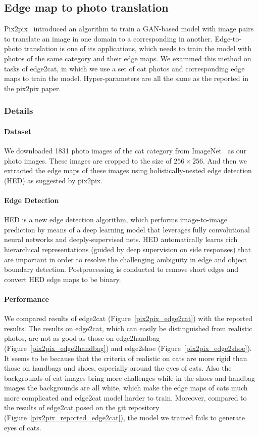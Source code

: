 \subsection{Edge map to photo translation}
Pix2pix~\cite{pix2pix} introduced an algorithm to train a GAN-based model with image pairs to translate an image in one domain to a corresponding in another. Edge-to-photo translation is one of its applications, which needs to train the model with photos of the same category and their edge maps. We examined this method on tasks of edge2cat, in which we use a set of cat photos and corresponding edge maps to train the model. Hyper-parameters are all the same as the reported in the pix2pix paper.
\subsubsection{Details}
\paragraph{Dataset}
We downloaded 1831 photo images of the cat category from ImageNet~\cite{ImageNet} as our photo images. These images are cropped to the size of $256\times 256$. And then we extracted the edge maps of these images using holistically-nested edge detection (HED) as suggested by pix2pix. 
\paragraph{Edge Detection}
HED is a new edge detection algorithm, which performs image-to-image prediction by means of a deep learning model that leverages fully convolutional neural networks and deeply-supervised nets. HED automatically learns rich hierarchical representations (guided by deep supervision on side responses) that are important in order to resolve the challenging ambiguity in edge and object boundary detection. Postprocessing is conducted to remove short edges and convert HED edge maps to be binary.
\paragraph{Performance}
We compared results of edge2cat (Figure~\ref{pix2pix_edge2cat}) with the reported results. The results on edge2cat, which can easily be distinguished from realistic photos, are not as good as those on edge2handbag (Figure~\ref{pix2pix_edge2handbag}) and edge2shoe (Figure~\ref{pix2pix_edge2shoe}). It seems to be because that the criteria of realistic on cats are more rigid than those on handbags and shoes, especially around the eyes of cats. Also the backgrounds of cat images bring more challenges while in the shoes and handbag images the backgrounds are all white, which make the edge maps of cats much more complicated and edge2cat model harder to train. Moreover, compared to the results of edge2cat posed on the git repository (Figure~\ref{pix2pix_reported_edge2cat}), the model we trained fails to generate eyes of cats. 
